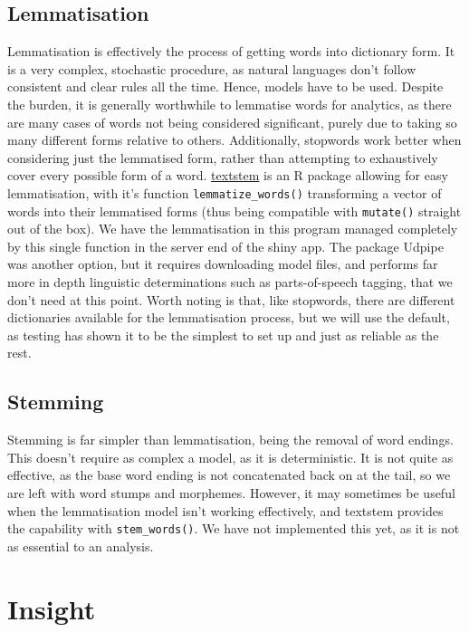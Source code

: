 \documentclass[11pt, a4paper, oneside]{report}
\begin{document}
\subsection{Lemmatisation}
\label{sec:org33549e9}
Lemmatisation is effectively the process of getting words into
dictionary form. It is a very complex, stochastic procedure, as
natural languages don't follow consistent and clear rules all the
time. Hence, models have to be used. Despite the burden, it is
generally worthwhile to lemmatise words for analytics, as there are
many cases of words not being considered significant, purely due to
taking so many different forms relative to others. Additionally,
stopwords work better when considering just the lemmatised form,
rather than attempting to exhaustively cover every possible form of a
word. \href{https://github.com/trinker/textstem/}{textstem} is an R
package allowing for easy lemmatisation, with it's function
\texttt{lemmatize_words()} transforming a vector of words into their
lemmatised forms (thus being compatible with \texttt{mutate()} straight
out of the box). We have the lemmatisation in this program managed
completely by this single function in the server end of the shiny app.
The package Udpipe was another option, but it requires downloading
model files, and performs far more in depth linguistic determinations
such as parts-of-speech tagging, that we don't need at this point.
Worth noting is that, like stopwords, there are different dictionaries
available for the lemmatisation process, but we will use the default,
as testing has shown it to be the simplest to set up and just as
reliable as the rest.
\subsection{Stemming}
\label{sec:orgca6bac4}
Stemming is far simpler than lemmatisation, being the removal of word
endings. This doesn't require as complex a model, as it is
deterministic. It is not quite as effective, as the base word ending
is not concatenated back on at the tail, so we are left with word
stumps and morphemes. However, it may sometimes be useful when the
lemmatisation model isn't working effectively, and textstem provides
the capability with \texttt{stem_words()}. We have not implemented this
yet, as it is not as essential to an analysis.
\section{Insight}
\label{sec:insight}
\end{document}
